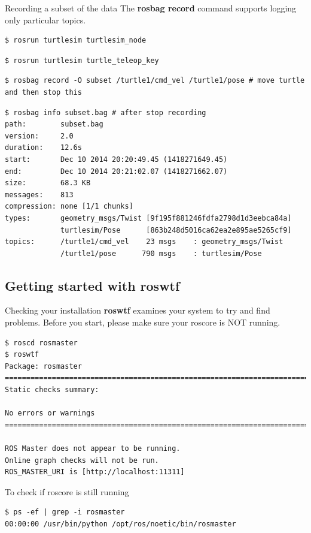 \begin{frame}[fragile]{Recording a subset of the data}
The \textbf{rosbag record} command supports logging only particular topics.

\begin{lstlisting}[language=shell]
$ rosrun turtlesim turtlesim_node 
\end{lstlisting}
\begin{lstlisting}[language=shell]
$ rosrun turtlesim turtle_teleop_key
\end{lstlisting}
\begin{lstlisting}[language=shell]
$ rosbag record -O subset /turtle1/cmd_vel /turtle1/pose # move turtle and then stop this
\end{lstlisting}
\begin{lstlisting}[language=shell]
$ rosbag info subset.bag # after stop recording
path:        subset.bag
version:     2.0
duration:    12.6s
start:       Dec 10 2014 20:20:49.45 (1418271649.45)
end:         Dec 10 2014 20:21:02.07 (1418271662.07)
size:        68.3 KB
messages:    813
compression: none [1/1 chunks]
types:       geometry_msgs/Twist [9f195f881246fdfa2798d1d3eebca84a]
             turtlesim/Pose      [863b248d5016ca62ea2e895ae5265cf9]
topics:      /turtle1/cmd_vel    23 msgs    : geometry_msgs/Twist
             /turtle1/pose      790 msgs    : turtlesim/Pose
\end{lstlisting}
\end{frame}

\subsection{Getting started with roswtf}

\begin{frame}[fragile]{Checking your installation}
\textbf{roswtf} examines your system to try and find problems. Before you start, please make sure your roscore is NOT running.

\begin{lstlisting}[language=shell]
$ roscd rosmaster
$ roswtf
Package: rosmaster
================================================================================
Static checks summary:

No errors or warnings
================================================================================

ROS Master does not appear to be running.
Online graph checks will not be run.
ROS_MASTER_URI is [http://localhost:11311]
\end{lstlisting}

\begin{alertblock}{To check if roscore is still running}
\begin{lstlisting}[language=shell]
$ ps -ef | grep -i rosmaster
00:00:00 /usr/bin/python /opt/ros/noetic/bin/rosmaster 
\end{lstlisting}
\end{alertblock}
\end{frame}

